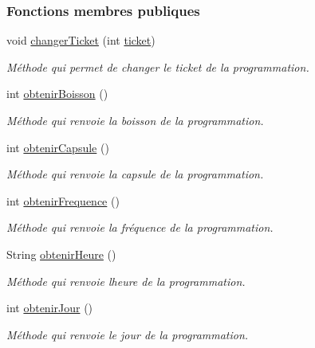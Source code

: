 \subsubsection*{Fonctions membres publiques}
\begin{DoxyCompactItemize}
\item 
void \hyperlink{classcom_1_1example_1_1ekawa_1_1_programmation_afb82bed29c60248fe8d966af8d6da897}{changer\+Ticket} (int \hyperlink{classcom_1_1example_1_1ekawa_1_1_programmation_a54ce49550025f7f5e5080f0548b08653}{ticket})
\begin{DoxyCompactList}\small\item\em Méthode qui permet de changer le ticket de la programmation. \end{DoxyCompactList}\item 
int \hyperlink{classcom_1_1example_1_1ekawa_1_1_programmation_a325b9fb3bb7e041e783ecc0ed8234c20}{obtenir\+Boisson} ()
\begin{DoxyCompactList}\small\item\em Méthode qui renvoie la boisson de la programmation. \end{DoxyCompactList}\item 
int \hyperlink{classcom_1_1example_1_1ekawa_1_1_programmation_a48d39b49a1250bbfaf51e4c32e934da0}{obtenir\+Capsule} ()
\begin{DoxyCompactList}\small\item\em Méthode qui renvoie la capsule de la programmation. \end{DoxyCompactList}\item 
int \hyperlink{classcom_1_1example_1_1ekawa_1_1_programmation_aa23acaed287ef27f86aec2771714a15f}{obtenir\+Frequence} ()
\begin{DoxyCompactList}\small\item\em Méthode qui renvoie la fréquence de la programmation. \end{DoxyCompactList}\item 
String \hyperlink{classcom_1_1example_1_1ekawa_1_1_programmation_ad8930be27ca5d1eed33c5e6729735897}{obtenir\+Heure} ()
\begin{DoxyCompactList}\small\item\em Méthode qui renvoie l\textquotesingle{}heure de la programmation. \end{DoxyCompactList}\item 
int \hyperlink{classcom_1_1example_1_1ekawa_1_1_programmation_a0e5090c0968474d6887518b7ef659337}{obtenir\+Jour} ()
\begin{DoxyCompactList}\small\item\em Méthode qui renvoie le jour de la programmation. \end{DoxyCompactList}\item 

\end{DoxyCompactItemize}
